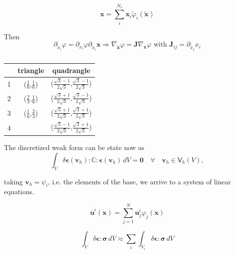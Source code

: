 \documentclass[3p]{elsarticle}
\begin{document}
\begin{equation}
\bm{x} =
\sum_{i}^{N_{v}} \bm{x}_i \tilde{\varphi}_i (\tilde{\bm{x}})
\end{equation}

Then
\begin{equation}
\partial_{\tilde{x}_i} \varphi =
\partial_{x_i} \varphi
\partial_{\tilde{x}_i} \bm{x} 
\Rightarrow 
\nabla_{\tilde{\bm{x}}} \varphi =
\bm{J}
\nabla_{\bm{x}} \varphi \text{ with }
\bm{J}_{ij} = 
\partial_{\tilde{x}_j} x_i 
\end{equation}



\begin{table}[ht]
\centering
\begin{tabular}{ | c | c | c | }
\hline
& triangle & quadrangle \\ 
\hline
1 &($\frac{1}{6}$,$\frac{1}{6}$)& ($\frac{\sqrt{3}-1}{2\sqrt{3}}$,$\frac{\sqrt{3}-1}{2\sqrt{3}}$)\\
2 &($\frac{2}{3}$,$\frac{1}{6}$)& ($\frac{\sqrt{3}+1}{2\sqrt{3}}$,$\frac{\sqrt{3}-1}{2\sqrt{3}}$)\\
3 &($\frac{1}{6}$,$\frac{2}{3}$)& ($\frac{\sqrt{3}+1}{2\sqrt{3}}$,$\frac{\sqrt{3}+1}{2\sqrt{3}}$)\\
4 &                             & ($\frac{\sqrt{3}-1}{2\sqrt{3}}$,$\frac{\sqrt{3}+1}{2\sqrt{3}}$)\\
\hline 
\end{tabular}
\caption{\label{tab:gauss}}
\end{table}


The discretized weak form can be state now as
\begin{equation}
\int_V \delta \bm{\epsilon}(\bm{v}_h) : \mathbb{C} : \bm{\epsilon}(\bm{v}_h) \,dV = \bm{0}
\quad \forall \quad \bm{v}_h \in \bm{\mathsf{V}}_h(V),
\end{equation}

\noindent
taking $\bm{v}_h = \psi_i$, i.e. the elements of the base, we
arrive to a system of linear equations.

\begin{equation}
\overline{\bm{u}}^i(\bm{x}) = 
\sum_{j=1}^N \bm{u}_j^i \varphi_j (\bm{x})
\end{equation}

\begin{equation}
\int_V \delta \bm{\epsilon}:\bm{\sigma} \,dV
\approx
\sum_i \int_{V_i} \delta \bm{\epsilon}:\bm{\sigma} \,dV
\end{equation}
\end{document}
